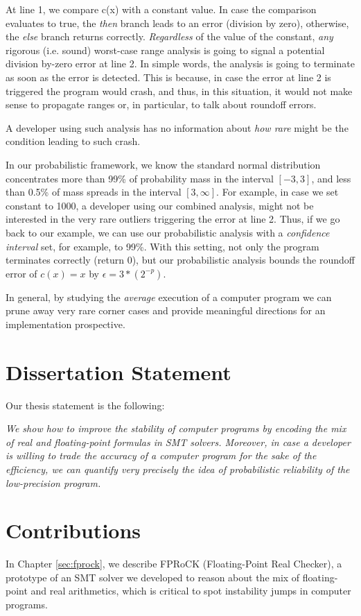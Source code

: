 At line 1, we compare c(x) with a constant value.
%
In case the comparison evaluates to true, the \emph{then} branch leads to an error (division by zero), otherwise, the \emph{else} branch returns correctly.
%
\emph{Regardless} of the value of the constant, \emph{any} rigorous (i.e. sound) worst-case range analysis is going to signal a potential division by-zero error at line 2.
%
In simple words, the analysis is going to terminate as soon as the error is detected.
%
This is because, in case the error at line 2 is triggered the program would crash, and thus, in this situation, it would not make sense to propagate ranges or, in particular, to talk about roundoff errors.

%
A developer using such analysis has no information about \emph{how rare} might be the condition leading to such crash. 
%

In our probabilistic framework, we know the standard normal distribution concentrates more than 99\% of probability mass in the interval $[−3, 3]$, and less than 0.5\% of mass spreads in the interval $[3, \infty]$.
%
For example, in case we set constant to 1000, a developer using our combined analysis, might not be interested in the very rare outliers triggering the error at line 2.
%
Thus, if we go back to our example, we can use our probabilistic analysis with a \emph{confidence interval} set, for example, to 99\%.
%
%
With this setting, not only the program terminates correctly (return 0), but our probabilistic analysis bounds the roundoff error of $c(x)=x$ by $\epsilon = 3*(2^{-p})$.
%

In general, by studying the \emph{average} execution of a computer program we can prune away very rare corner cases and provide meaningful directions for an implementation prospective.
%
\section{Dissertation Statement}
%
Our thesis statement is the following: 

%
\emph{We show how to improve the stability of computer programs by encoding the mix of real and floating-point formulas in SMT solvers.
%
Moreover, in case a developer is willing to trade the accuracy of a computer program for the sake of the efficiency, we can quantify very precisely the idea of probabilistic reliability of the low-precision program.}

\section{Contributions}
%
In Chapter \ref{sec:fprock}, we describe FPRoCK (Floating-Point Real Checker), a prototype of an SMT solver we developed to reason about the mix of floating-point and real arithmetics, which is critical to spot instability jumps in computer programs.

